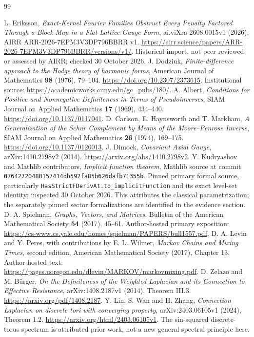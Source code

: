 \documentclass[11pt]{article}
\begin{document}
\begin{thebibliography}{99}
\small
\raggedright
{} L. Eriksson, \emph{Exact-Kernel Fourier Families Obstruct
Every Penalty Factored Through a Block Map in a Flat Lattice Gauge Form},
ai.viXra 2608.0015v1 (2026), AIRR ARR-2026-7EPM3V3DP796BBRR v1.
\url{https://airr.science/papers/ARR-2026-7EPM3V3DP796BBRR/versions/v1/}.
Historical import, not peer reviewed or assessed by AIRR; checked 30 October 2026.
 J. Dodziuk, \emph{Finite-difference approach to the Hodge
theory of harmonic forms}, American Journal of Mathematics \textbf{98}
(1976), 79--104. \url{https://doi.org/10.2307/2373615}.
Institutional source: \url{https://academicworks.cuny.edu/gc_pubs/180/}.
 A. Albert, \emph{Conditions for Positive and Nonnegative
Definiteness in Terms of Pseudoinverses}, SIAM Journal on Applied Mathematics
\textbf{17} (1969), 434--440. \url{https://doi.org/10.1137/0117041}.
 D. Carlson, E. Haynsworth and T. Markham,
\emph{A Generalization of the Schur Complement by Means of the Moore--Penrose
Inverse}, SIAM Journal on Applied Mathematics \textbf{26} (1974), 169--175.
\url{https://doi.org/10.1137/0126013}.
 J. Dimock, \emph{Covariant Axial Gauge},
arXiv:1410.2798v2 (2014). \url{https://arxiv.org/abs/1410.2798v2}.
 Y. Kudryashov and Mathlib contributors,
\emph{Implicit function theorem}, Mathlib source at commit
\texttt{07642720480157414db592fa85b626dafb71355b}.
\href{https://github.com/leanprover-community/mathlib4/blob/07642720480157414db592fa85b626dafb71355b/Mathlib/Analysis/Calculus/Implicit.lean}{Pinned primary formal source},
particularly \texttt{HasStrictFDerivAt.to\_implicitFunction} and its exact
level-set identity; inspected 30 October 2026. This attributes the classical parametrization; the separately pinned sector formalizations are identified in the evidence section.
 D. A. Spielman, \emph{Graphs, Vectors, and Matrices},
Bulletin of the American Mathematical Society \textbf{54} (2017), 45--61.
Author-hosted primary exposition:
\url{https://cs-www.cs.yale.edu/homes/spielman/PAPERS/bull1557.pdf}.
 D. A. Levin and Y. Peres, with contributions by
E. L. Wilmer, \emph{Markov Chains and Mixing Times}, second edition,
American Mathematical Society (2017), Chapter 13.
Author-hosted text: \url{https://pages.uoregon.edu/dlevin/MARKOV/markovmixing.pdf}.
 D. Zelazo and M. B{\"u}rger,
\emph{On the Definiteness of the Weighted Laplacian and its Connection to
Effective Resistance}, arXiv:1408.2187v1 (2014), Theorem III.3.
\url{https://arxiv.org/pdf/1408.2187}.
 Y. Lin, S. Wan and H. Zhang,
\emph{Connection Laplacian on discrete tori with converging property},
arXiv:2403.06105v1 (2024), Theorem 1.2.
\url{https://arxiv.org/html/2403.06105v1}.
The sin-squared discrete-torus spectrum is attributed prior work, not a new
general spectral principle here.
\end{thebibliography}
\end{document}
